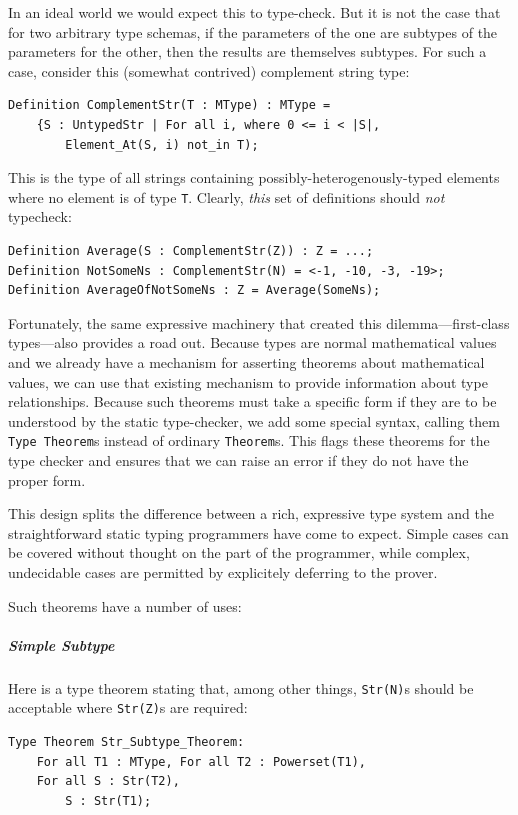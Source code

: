 In an ideal world we would expect this to type-check.  But it is not the case that for two arbitrary type schemas, if the parameters of the one are subtypes of the parameters for the other, then the results are themselves subtypes.  For such a case, consider this (somewhat contrived) complement string type:

\begin{lstlisting}
Definition ComplementStr(T : MType) : MType = 
	{S : UntypedStr | For all i, where 0 <= i < |S|,
		Element_At(S, i) not_in T);
\end{lstlisting}

This is the type of all strings containing possibly-heterogenously-typed elements where no element is of type \texttt{T}.  Clearly, \emph{this} set of definitions should \emph{not} typecheck:

\begin{lstlisting}
Definition Average(S : ComplementStr(Z)) : Z = ...;
Definition NotSomeNs : ComplementStr(N) = <-1, -10, -3, -19>;
Definition AverageOfNotSomeNs : Z = Average(SomeNs);
\end{lstlisting}

Fortunately, the same expressive machinery that created this dilemma---first-class types---also provides a road out.  Because types are normal mathematical values and we already have a mechanism for asserting theorems about mathematical values, we can use that existing mechanism to provide information about type relationships.  Because such theorems must take a specific form if they are to be understood by the static type-checker, we add some special syntax, calling them \texttt{Type Theorem}s instead of ordinary \texttt{Theorem}s.  This flags these theorems for the type checker and ensures that we can raise an error if they do not have the proper form.

This design splits the difference between a rich, expressive type system and the straightforward static typing programmers have come to expect.  Simple cases can be covered without thought on the part of the programmer, while complex, undecidable cases are permitted by explicitely deferring to the prover.

Such theorems have a number of uses:

\subparagraph{Simple Subtype}
Here is a type theorem stating that, among other things, \texttt{Str(N)}s should be acceptable where \texttt{Str(Z)}s are required:

\begin{lstlisting}
Type Theorem Str_Subtype_Theorem:
	For all T1 : MType, For all T2 : Powerset(T1),
	For all S : Str(T2),
		S : Str(T1);
\end{lstlisting}

